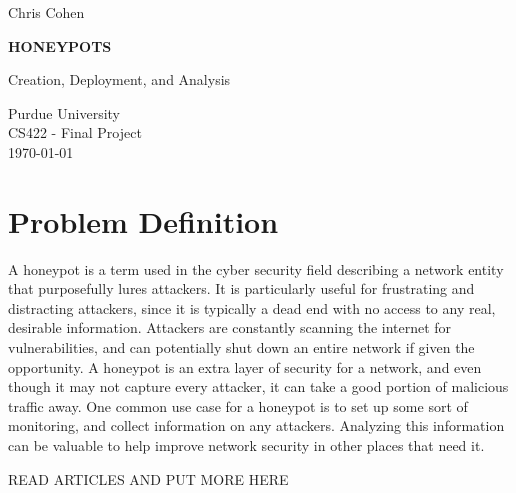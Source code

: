 \documentclass[12pt]{article}
\begin{document}

\begin{titlepage}
    \begin{center}
        \vspace*{1cm}
        \large
        Chris Cohen

        \vspace{6cm}
        \HUGE
        \textbf{HONEYPOTS}

        \Large
        Creation, Deployment, and Analysis\\

        \vfill

        \normalsize
        Purdue University\\
        CS422 - Final Project\\
        \today
            
    \end{center}
\end{titlepage}


\section{Problem Definition}
A honeypot is a term used in the cyber security field describing a network entity that purposefully lures attackers.
It is particularly useful for frustrating and distracting attackers, since it is typically a dead end with no access to any real, desirable information.
Attackers are constantly scanning the internet for vulnerabilities, and can potentially shut down an entire network if given the opportunity.
A honeypot is an extra layer of security for a network, and even though it may not capture every attacker, it can take a good portion of malicious traffic away.
One common use case for a honeypot is to set up some sort of monitoring, and collect information on any attackers.
Analyzing this information can be valuable to help improve network security in other places that need it.

READ ARTICLES AND PUT MORE HERE

\end{document}
